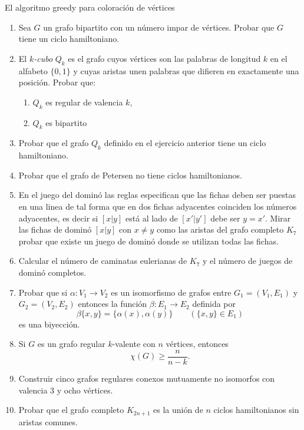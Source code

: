 \begin{section}{El algoritmo greedy para coloración de vértices}
\begin{enumerate}
\item Sea $G$ un grafo bipartito con un número impar de vértices. Probar que $G$ tiene un ciclo hamiltoniano.

\item El \textit{$k$-cubo} $Q_k$ es el grafo cuyos vértices son las palabras de longitud $k$ en el alfabeto $\{0,1\}$ y cuyas aristas unen palabras que difieren en exactamente una posición. Probar que: 
\begin{enumerate}
    \item $Q_k$ es regular de valencia $k$,
    
    \item $Q_k$ es bipartito
\end{enumerate}

\item Probar que el grafo $Q_k$ definido en el ejercicio anterior tiene un ciclo hamiltoniano.

\item Probar que el grafo de Petersen no tiene ciclos hamiltonianos.

\item En el juego del dominó las reglas especifican que las fichas deben ser puestas en una linea de tal forma que en dos fichas adyacentes coinciden los números adyacentes, es decir si $[x|y]$ está al lado de $[x'|y']$ debe ser $y=x'$. Mirar las fichas de dominó $[x|y]$ con $x\not=y$ como las aristas del grafo completo $K_7$ probar que existe un juego de dominó donde se utilizan todas las fichas.

\item Calcular el número de caminatas eulerianas de $K_7$ y el número de juegos de dominó completos.

\item Probar que si $\alpha: V_1 \to  V_2$ es un isomorfismo de grafos entre $G_1=(V_1,E_1)$ y  $G_2=(V_2,E_2)$ entonces la función $\beta:E_1 \to  E_2$ definida por
$$
\beta\{x,y\} = \{\alpha(x),\alpha(y)\} \qquad (\{x,y\} \in E_1)
$$
es una biyección.

\item Si $G$ es un grafo regular $k$-valente con $n$ vértices, entonces 
$$
\chi(G)\ge \frac{n}{n-k}.
$$

\item Construir cinco grafos regulares conexos mutuamente no isomorfos
con valencia $3$ y ocho vértices.

\item Probar que el grafo completo $K_{2n+1}$ es la unión de $n$ ciclos
hamiltonianos sin aristas comunes.


\end{enumerate}
\end{section}
